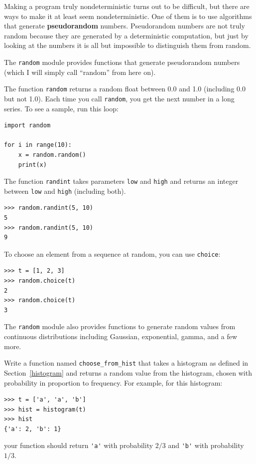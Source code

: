 \documentclass[10pt]{book}
\begin{document}
Making a program truly nondeterministic turns out to be difficult,
but there are ways to make it at least seem nondeterministic.  One of
them is to use algorithms that generate {\bf pseudorandom} numbers.
Pseudorandom numbers are not truly random because they are generated
by a deterministic computation, but just by looking at the numbers it
is all but impossible to distinguish them from random.

The {\tt random} module provides functions that generate
pseudorandom numbers (which I will simply call ``random'' from
here on).

The function {\tt random} returns a random float
between 0.0 and 1.0 (including 0.0 but not 1.0).  Each time you
call {\tt random}, you get the next number in a long series.  To see a
sample, run this loop:

\begin{verbatim}
import random

for i in range(10):
    x = random.random()
    print(x)
\end{verbatim}
%
The function {\tt randint} takes parameters {\tt low} and
{\tt high} and returns an integer between {\tt low} and
{\tt high} (including both).

\begin{verbatim}
>>> random.randint(5, 10)
5
>>> random.randint(5, 10)
9
\end{verbatim}
%
To choose an element from a sequence at random, you can use
{\tt choice}:

\begin{verbatim}
>>> t = [1, 2, 3]
>>> random.choice(t)
2
>>> random.choice(t)
3
\end{verbatim}
%
The {\tt random} module also provides functions to generate
random values from continuous distributions including
Gaussian, exponential, gamma, and a few more.

\begin{exercise}

Write a function named \verb"choose_from_hist" that takes
a histogram as defined in Section~\ref{histogram} and returns a
random value from the histogram, chosen with probability
in proportion to frequency.  For example, for this histogram:

\begin{verbatim}
>>> t = ['a', 'a', 'b']
>>> hist = histogram(t)
>>> hist
{'a': 2, 'b': 1}
\end{verbatim}
%
your function should return \verb"'a'" with probability $2/3$ and \verb"'b'"
with probability $1/3$.
\end{exercise}
\end{document}

